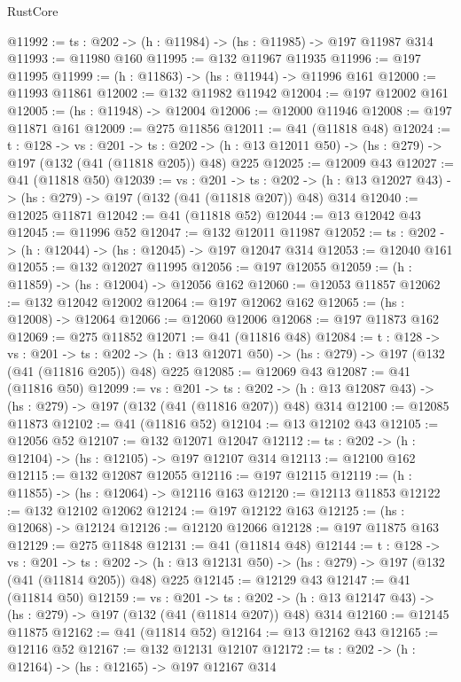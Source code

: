 \begin{lexlean}{RustCore}
\begin{coremodule}
@11992 := {ts : @202} -> (h : @11984) -> (hs : @11985) -> @197 @11987 @314
@11993 := @11980 @160
@11995 := @132 @11967 @11935
@11996 := @197 @11995
@11999 := (h : @11863) -> (hs : @11944) -> @11996 @161
@12000 := @11993 @11861
@12002 := @132 @11982 @11942
@12004 := @197 @12002 @161
@12005 := (hs : @11948) -> @12004
@12006 := @12000 @11946
@12008 := @197 @11871 @161
@12009 := @275 @11856
@12011 := @41 (@11818 @48)
@12024 := {t : @128} ->
  {vs : @201} ->
  {ts : @202} -> (h : @13 @12011 @50) -> (hs : @279) -> @197 (@132 (@41 (@11818 @205)) @48) @225
@12025 := @12009 @43
@12027 := @41 (@11818 @50)
@12039 := {vs : @201} ->
  {ts : @202} -> (h : @13 @12027 @43) -> (hs : @279) -> @197 (@132 (@41 (@11818 @207)) @48) @314
@12040 := @12025 @11871
@12042 := @41 (@11818 @52)
@12044 := @13 @12042 @43
@12045 := @11996 @52
@12047 := @132 @12011 @11987
@12052 := {ts : @202} -> (h : @12044) -> (hs : @12045) -> @197 @12047 @314
@12053 := @12040 @161
@12055 := @132 @12027 @11995
@12056 := @197 @12055
@12059 := (h : @11859) -> (hs : @12004) -> @12056 @162
@12060 := @12053 @11857
@12062 := @132 @12042 @12002
@12064 := @197 @12062 @162
@12065 := (hs : @12008) -> @12064
@12066 := @12060 @12006
@12068 := @197 @11873 @162
@12069 := @275 @11852
@12071 := @41 (@11816 @48)
@12084 := {t : @128} ->
  {vs : @201} ->
  {ts : @202} -> (h : @13 @12071 @50) -> (hs : @279) -> @197 (@132 (@41 (@11816 @205)) @48) @225
@12085 := @12069 @43
@12087 := @41 (@11816 @50)
@12099 := {vs : @201} ->
  {ts : @202} -> (h : @13 @12087 @43) -> (hs : @279) -> @197 (@132 (@41 (@11816 @207)) @48) @314
@12100 := @12085 @11873
@12102 := @41 (@11816 @52)
@12104 := @13 @12102 @43
@12105 := @12056 @52
@12107 := @132 @12071 @12047
@12112 := {ts : @202} -> (h : @12104) -> (hs : @12105) -> @197 @12107 @314
@12113 := @12100 @162
@12115 := @132 @12087 @12055
@12116 := @197 @12115
@12119 := (h : @11855) -> (hs : @12064) -> @12116 @163
@12120 := @12113 @11853
@12122 := @132 @12102 @12062
@12124 := @197 @12122 @163
@12125 := (hs : @12068) -> @12124
@12126 := @12120 @12066
@12128 := @197 @11875 @163
@12129 := @275 @11848
@12131 := @41 (@11814 @48)
@12144 := {t : @128} ->
  {vs : @201} ->
  {ts : @202} -> (h : @13 @12131 @50) -> (hs : @279) -> @197 (@132 (@41 (@11814 @205)) @48) @225
@12145 := @12129 @43
@12147 := @41 (@11814 @50)
@12159 := {vs : @201} ->
  {ts : @202} -> (h : @13 @12147 @43) -> (hs : @279) -> @197 (@132 (@41 (@11814 @207)) @48) @314
@12160 := @12145 @11875
@12162 := @41 (@11814 @52)
@12164 := @13 @12162 @43
@12165 := @12116 @52
@12167 := @132 @12131 @12107
@12172 := {ts : @202} -> (h : @12164) -> (hs : @12165) -> @197 @12167 @314

\end{coremodule}
\end{lexlean}
